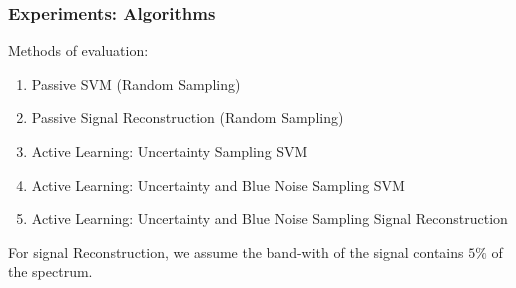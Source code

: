 \documentclass[11pts]{beamer}
\begin{document}



\begin{frame}%
\frametitle{Experiments: Algorithms }
Methods of evaluation:

\begin{enumerate} 
    \item Passive SVM (Random Sampling) 
    \item Passive Signal Reconstruction (Random Sampling) 
    \item Active Learning: Uncertainty Sampling SVM
    \item Active Learning: Uncertainty and Blue Noise Sampling SVM
     \item Active Learning: Uncertainty and Blue Noise Sampling Signal Reconstruction
\end{enumerate}

For signal Reconstruction, we assume the band-with of the signal contains $5\%$ of the spectrum. 
\end{frame}

\end{document}
